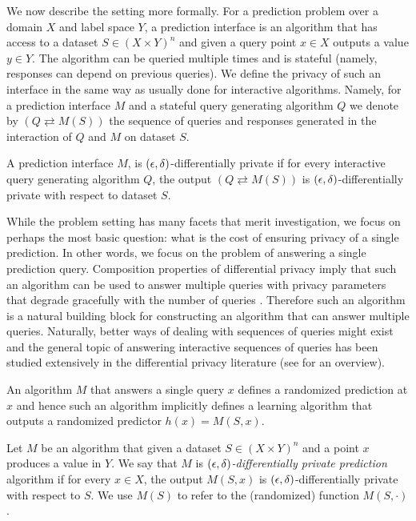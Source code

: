 \documentclass[final,12pt]{colt2018}
\begin{document}
We now describe the setting more formally. For a prediction problem over a domain $X$ and label space $Y$, a prediction interface is an algorithm that has access to a dataset $S \in (X\times Y)^n$ and given a query point $x\in X$ outputs a value $y \in Y$. The algorithm can be queried multiple times and is stateful (namely, responses can depend on previous queries). We define the privacy of such an interface in the same way as usually done for interactive algorithms. Namely, for a prediction interface $M$ and a stateful query generating algorithm $Q$ we denote by $(Q\rightleftarrows M(S))$ the sequence of queries and responses generated in the interaction of $Q$ and $M$ on dataset $S$.
\begin{defn}
A prediction interface $M$, is $(\epsilon,\delta)$-differentially private if for every interactive query generating algorithm $Q$, the output $(Q\rightleftarrows M(S))$ is $(\epsilon,\delta)$-differentially private with respect to dataset $S$.
\end{defn}

While the problem setting has many facets that merit investigation, we focus on perhaps the most basic question: what is the cost of ensuring privacy of a single prediction. In other words, we focus on the problem of answering a single prediction query. Composition properties of differential privacy imply that such an algorithm can be used to answer multiple queries with privacy parameters that degrade gracefully with the number of queries \citep{DworkRoth:14}. Therefore such an algorithm is a natural building block for constructing an algorithm that can answer multiple queries. Naturally, better ways of dealing with sequences of queries might exist and the general topic of answering interactive sequences of queries has been studied extensively in the differential privacy literature (see \citep{DworkRoth:14} for an overview).

An algorithm $M$ that answers a single query $x$ defines a randomized prediction at $x$ and hence such an algorithm implicitly defines a learning algorithm that outputs a randomized predictor $h(x) = M(S,x)$.
\begin{defn}
\label{def:prediction-privacy}
Let $M$ be an algorithm that given a dataset $S\in (X\times Y)^n$ and a point $x$ produces a value in $Y$. We say that $M$ is {\em  $(\epsilon,\delta)$-differentially private prediction} algorithm if for every $x \in X$, the output $M(S,x)$ is $(\epsilon,\delta)$-differentially private with respect to $S$. We use $M(S)$ to refer to the (randomized) function $M(S,\cdot)$.
\end{defn}
\end{document}
